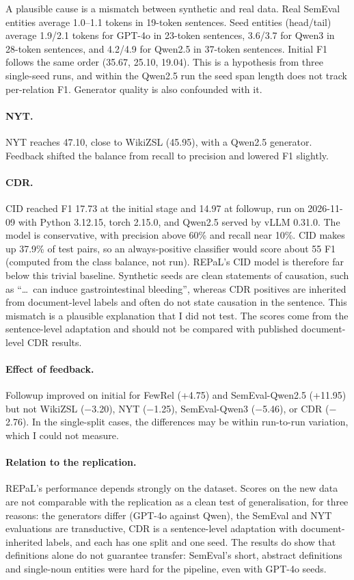 A plausible cause is a mismatch between synthetic and real data. Real SemEval entities average 1.0--1.1 tokens in 19-token sentences. Seed entities (head/tail) average 1.9/2.1 tokens for GPT-4o in 23-token sentences, 3.6/3.7 for Qwen3 in 28-token sentences, and 4.2/4.9 for Qwen2.5 in 37-token sentences. Initial F1 follows the same order (35.67, 25.10, 19.04). This is a hypothesis from three single-seed runs, and within the Qwen2.5 run the seed span length does not track per-relation F1. Generator quality is also confounded with it.

\paragraph{NYT.} NYT reaches 47.10, close to WikiZSL (45.95), with a Qwen2.5 generator. Feedback shifted the balance from recall to precision and lowered F1 slightly.

\paragraph{CDR.} CID reached F1 17.73 at the initial stage and 14.97 at followup, run on 2026-11-09 with Python 3.12.15, torch 2.15.0, and Qwen2.5 served by vLLM 0.31.0. The model is conservative, with precision above 60\% and recall near 10\%. CID makes up 37.9\% of test pairs, so an always-positive classifier would score about 55 F1 (computed from the class balance, not run). REPaL's CID model is therefore far below this trivial baseline. Synthetic seeds are clean statements of causation, such as ``\ldots\ can induce gastrointestinal bleeding'', whereas CDR positives are inherited from document-level labels and often do not state causation in the sentence. This mismatch is a plausible explanation that I did not test. The scores come from the sentence-level adaptation and should not be compared with published document-level CDR results.

\paragraph{Effect of feedback.} Followup improved on initial for FewRel (+4.75) and SemEval-Qwen2.5 (+11.95) but not WikiZSL ($-$3.20), NYT ($-$1.25), SemEval-Qwen3 ($-$5.46), or CDR ($-$2.76). In the single-split cases, the differences may be within run-to-run variation, which I could not measure.

\paragraph{Relation to the replication.} REPaL's performance depends strongly on the dataset. Scores on the new data are not comparable with the replication as a clean test of generalisation, for three reasons: the generators differ (GPT-4o against Qwen), the SemEval and NYT evaluations are transductive, CDR is a sentence-level adaptation with document-inherited labels, and each has one split and one seed. The results do show that definitions alone do not guarantee transfer: SemEval's short, abstract definitions and single-noun entities were hard for the pipeline, even with GPT-4o seeds.

